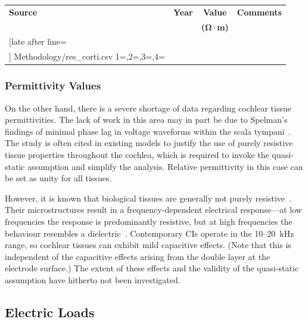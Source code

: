 \begin{table}
\begin{subtable}[t]{0.9\textwidth}
		\begin{tabularx}{\textwidth}{p{2.6cm} c c X}
			\toprule
			\textbf{Source}	& \textbf{Year}	& \textbf{Value} & \textbf{Comments} \\
				& 	& \textbf{($ \mathsf{\boldsymbol{\Omega}} \cdot $m)} & \\
			\midrule
			
			\csvreader[late after line=\\]%
				{Methodology/res_corti.csv}%
				{1=\src,2=\year,3=\val,4=\comm}%
	 			{\src & \year & \val & \comm}%
			\bottomrule
		\end{tabularx}
		
    \end{subtable}
\end{table}

\subsubsection{Permittivity Values}

On the other hand, there is a severe shortage of data regarding cochlear tissue
permittivities. The lack of work in this area may in part be due to Spelman's
findings of minimal phase lag in voltage waveforms within the scala
tympani~\cite{spelman1982}. The study is often cited in existing models to
justify the use of purely resistive tissue properties throughout the cochlea,
which is required to invoke the quasi-static assumption and simplify the
analysis. Relative permittivity in this case can be set as unity for all
tissues.

However, it is known that biological tissues are generally not purely
resistive~\cite{brown2001}. Their microstructures result in a
frequency-dependent electrical response---at low frequencies the response is
predominantly resistive, but at high frequencies the behaviour resembles a
dielectric~\cite{spelman1982,girzon1987,baker1989,grimnes2000}. Contemporary CIs
operate in the 10--20~kHz range, so cochlear tissues can exhibit mild capacitive
effects. (Note that this is independent of the capacitive effects arising
from the double layer at the electrode surface.) The extent of these effects and
the validity of the quasi-static assumption have hitherto not been investigated.

\subsection{Electric Loads}

